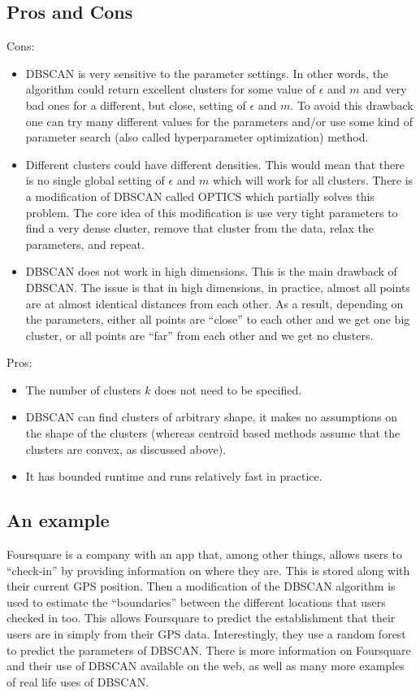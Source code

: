   \subsection{Pros and Cons}
  Cons:
  \begin{itemize}
    \item DBSCAN is very sensitive to the parameter settings. In other words, the algorithm could return excellent clusters for some value of $\epsilon$ and $m$
    and very bad ones for a different, but close, setting of $\epsilon$ and $m$. To avoid this drawback one can try many different values for the parameters and/or use
    some kind of parameter search (also called hyperparameter optimization) method.
    \item Different clusters could have different densities. This would mean that there is no single global setting of $\epsilon$ and $m$ which will work for all clusters.
    There is a modification of DBSCAN called OPTICS which partially solves this problem. The core idea of this modification is use very tight parameters to find a very
    dense cluster, remove that cluster from the data, relax the parameters, and repeat.
    \item DBSCAN does not work in high dimensions. This is the main drawback of DBSCAN. The issue is that in high dimensions, in practice, almost all points are
    at almost identical distances from each other. As a result, depending on the parameters, either all points are ``close'' to each other and we get one big
    cluster, or all points are ``far'' from each other and we get no clusters.
  \end{itemize}
  Pros:
  \begin{itemize}
    \item The number of clusters $k$ does not need to be specified.
    \item DBSCAN can find clusters of arbitrary shape, it makes no assumptions on the shape of the clusters (whereas centroid based methods assume that the clusters are convex, as discussed above).
    \item It has bounded runtime and runs relatively fast in practice.
  \end{itemize}

  \subsection{An example}
  Foursquare is a company with an app that, among other things, allows users to ``check-in'' by providing information on where they are. This is stored along with their current GPS position.
  Then a modification of the DBSCAN algorithm is used to estimate the ``boundaries'' between the different locations that users checked in too. This allows Foursquare to predict the establishment that
  their users are in simply from their GPS data. Interestingly, they use a random forest to predict the parameters of DBSCAN. There is more information on Foursquare and their use of
  DBSCAN available on the web, as well as many more examples of real life uses of DBSCAN.
